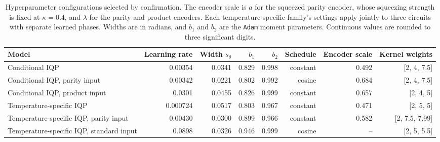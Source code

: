 \begin{table}[t]
\centering
\small
\caption{Hyperparameter configurations selected by confirmation. The encoder scale is $a$ for the squeezed parity encoder, whose squeezing strength is fixed at $\kappa=0.4$, and $\lambda$ for the parity and product encoders. Each temperature-specific family's settings apply jointly to three circuits with separate learned phases. Widths are in radians, and $b_1$ and $b_2$ are the \texttt{Adam} moment parameters. Continuous values are rounded to three significant digits.}
\label{tab:cw_selected_settings}
\begin{tabular}{lrrrrrrr}
\toprule
Model & Learning rate & Width $s_\theta$ & $b_1$ & $b_2$ & Schedule & Encoder scale & Kernel weights \\
\midrule
Conditional IQP & 0.00354 & 0.0341 & 0.829 & 0.998 & constant & 0.492 & [2, 4, 7.5] \\
Conditional IQP, parity input & 0.00342 & 0.0221 & 0.802 & 0.992 & cosine & 0.684 & [2, 4, 7.5] \\
Conditional IQP, product input & 0.0301 & 0.0455 & 0.826 & 0.999 & constant & 0.657 & [2, 4, 5] \\
Temperature-specific IQP & 0.000724 & 0.0517 & 0.803 & 0.967 & constant & 0.471 & [2, 5, 5] \\
Temperature-specific IQP, parity input & 0.00430 & 0.0300 & 0.899 & 0.966 & constant & 0.582 & [2, 7.5, 7.99] \\
Temperature-specific IQP, standard input & 0.0898 & 0.0326 & 0.946 & 0.999 & cosine & -- & [2, 5, 5.5] \\
\bottomrule
\end{tabular}
\end{table}
